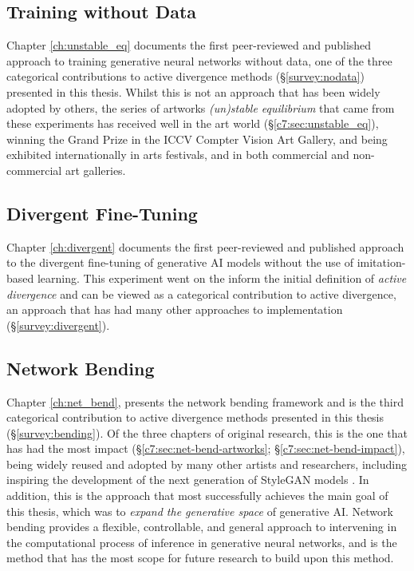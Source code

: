 \subsection{Training without Data}

Chapter \ref{ch:unstable_eq} documents the first peer-reviewed and published approach to training generative neural networks without data, one of the three categorical contributions to active divergence methods (\S \ref{survey:nodata}) presented in this thesis.
Whilst this is not an approach that has been widely adopted by others, the series of artworks \textit{(un)stable equilibrium} that came from these experiments has received well in the art world (\S \ref{c7:sec:unstable_eq}), winning the Grand Prize in the ICCV Compter Vision Art Gallery, and being exhibited internationally in arts festivals, and in both commercial and non-commercial art galleries. 

\subsection{Divergent Fine-Tuning}

Chapter \ref{ch:divergent} documents the first peer-reviewed and published approach to the divergent fine-tuning of generative AI models without the use of imitation-based learning.
This experiment went on the inform the initial definition of \textit{active divergence} \citep{berns2020bridging} and can be viewed as a categorical contribution to active divergence, an approach that has had many other approaches to implementation (\S \ref{survey:divergent}).


\subsection{Network Bending}

Chapter \ref{ch:net_bend}, presents the network bending framework and is the third categorical contribution to active divergence methods presented in this thesis (\S \ref{survey:bending}).
Of the three chapters of original research, this is the one that has had the most impact (\S \ref{c7:sec:net-bend-artworks}; \S \ref{c7:sec:net-bend-impact}), being widely reused and adopted by many other artists and researchers, including inspiring the development of the next generation of StyleGAN models \citep{karras2021alias}.
In addition, this is the approach that most successfully achieves the main goal of this thesis, which was to \textit{expand the generative space} of generative AI. 
Network bending provides a flexible, controllable, and general approach to intervening in the computational process of inference in generative neural networks, and is the method that has the most scope for future research to build upon this method.

